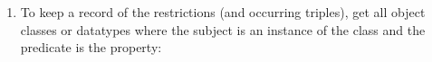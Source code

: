 \begin{enumerate}[leftmargin=0cm]
																																																																																																																																																																																																																																																																																																																																																																																																																																																																																																																																																																																\item To keep a record of the restrictions (and occurring triples), get all object classes or datatypes where the subject is an instance of the class and the predicate is the property:\\

\end{enumerate}
